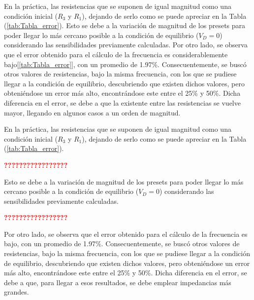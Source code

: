 En la práctica, las resistencias que se suponen de igual magnitud como una condición inicial ($R_3$ y $R_1$), dejando de serlo como se puede apreciar en la Tabla (\ref{tab:Tabla_error}). Esto se debe a la variación de magnitud de los presets para poder llegar lo más cercano posible a la condición de equilibrio ($V_D=0$) considerando las sensibilidades previamente calculadas. 
Por otro lado, se observa que el error obtenido para el cálculo de la frecuencia es considerablemente bajo[\ref{tab:Tabla_error}], con un promedio de 1.97\%. Consecuentemente, se buscó otros valores de resistencias, bajo la misma frecuencia, con los que se pudiese llegar a la condición de equilibrio, descubriendo que existen dichos valores, pero obteniéndose un error más alto, encontrándose este entre el 25\% y 50\%. Dicha diferencia en el error, se debe a que la existente entre las resistencias se vuelve mayor, llegando en algunos casos a un orden de magnitud. 

En la práctica, las resistencias que se suponen de igual magnitud como una condición inicial ($R_3$ y $R_1$), dejando de serlo como se puede apreciar en la Tabla (\ref{tab:Tabla_error}).
\begin{center}
	\huge{\textcolor{red}{\textbf{?????????????????}}}
\end{center}
Esto se debe a la variación de magnitud de los presets para poder llegar lo más cercano posible a la condición de equilibrio ($V_D=0$) considerando las sensibilidades previamente calculadas.
\begin{center}
	\huge{\textcolor{red}{\textbf{?????????????????}}}
\end{center}
Por otro lado, se observa que el error obtenido para el cálculo de la frecuencia es bajo, con un promedio de 1.97\%. Consecuentemente, se buscó otros valores de resistencias, bajo la misma frecuencia, con los que se pudiese llegar a la condición de equilibrio, descubriendo que existen dichos valores, pero obteniéndose un error más alto, encontrándose este entre el 25\% y 50\%. Dicha diferencia en el error, se debe a que, para llegar a esos resultados, se debe emplear impedancias más grandes.

